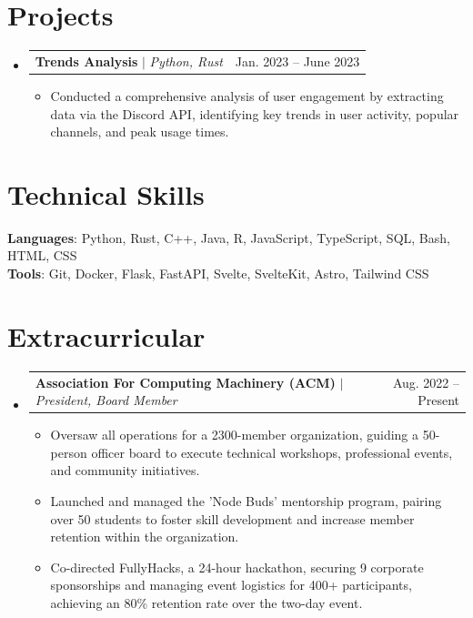 \documentclass[letterpaper,11pt]{article}
\makeatletter
\newcommand{\resumeItem}[1]{
  \item\small{
    {#1 \vspace{-2pt}}
  }
}
\newcommand{\resumeProjectHeading}[2]{
    \item
    \begin{tabular*}{0.97\textwidth}{l@{\extracolsep{\fill}}r}
      \small#1 & #2 \\
    \end{tabular*}\vspace{-7pt}
}
\newcommand{\resumeSubHeadingListStart}{\begin{itemize}[leftmargin=0.15in, label={}]}
\newcommand{\resumeSubHeadingListEnd}{\end{itemize}}
\newcommand{\resumeItemListStart}{\begin{itemize}}
\newcommand{\resumeItemListEnd}{\end{itemize}\vspace{-5pt}}
\makeatother
\begin{document}
\section{Projects}
    \resumeSubHeadingListStart
        \resumeProjectHeading
              {\textbf{Trends Analysis} $|$ \emph{Python, Rust}}{Jan. 2023 -- June 2023}
              \resumeItemListStart
                \resumeItem{Conducted a comprehensive analysis of user engagement by extracting data via the Discord API, identifying key trends in user activity, popular channels, and peak usage times.}
              \resumeItemListEnd
    \resumeSubHeadingListEnd

\section{Technical Skills}
 \begin{itemize}[leftmargin=0.15in, label={}]
    \small{\item{
     \textbf{Languages}{: Python, Rust, C++, Java, R, JavaScript, TypeScript, SQL, Bash, HTML, CSS } \\
     \textbf{Tools}{: Git, Docker, Flask, FastAPI, Svelte, SvelteKit, Astro, Tailwind CSS}
    }}
 \end{itemize}

\section{Extracurricular}
    \resumeSubHeadingListStart
      \resumeProjectHeading
          {\textbf{Association For Computing Machinery (ACM) } $|$ \emph{President, Board Member}}{Aug. 2022 -- Present}
          \resumeItemListStart
            \resumeItem{Oversaw all operations for a 2300-member organization, guiding a 50-person officer board to execute technical workshops, professional events, and community initiatives.}
            \resumeItem{Launched and managed the 'Node Buds' mentorship program, pairing over 50 students to foster skill development and increase member retention within the organization.}
            \resumeItem{Co-directed FullyHacks, a 24-hour hackathon, securing 9 corporate sponsorships and managing event logistics for 400+ participants, achieving an 80\% retention rate over the two-day event.}
          \resumeItemListEnd
    \resumeSubHeadingListEnd


\end{document}
